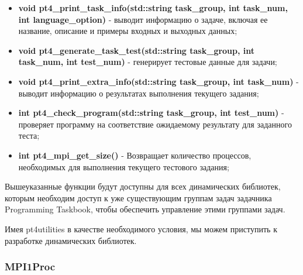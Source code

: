 \begin{itemize}
	\item \textbf{void pt4\_print\_task\_info(std::string task\_group, int task\_num, int language\_option)} - выводит информацию о задаче, включая ее название, описание и примеры входных и выходных данных;
	\item \textbf{void pt4\_generate\_task\_test(std::string task\_group, int task\_num, int test\_num)} - генерирует тестовые данные для задачи;
	\item \textbf{void pt4\_print\_extra\_info(std::string task\_group, int task\_num)} - выводит информацию о результатах выполнения текущего задания;
	\item \textbf{int pt4\_check\_program(std::string task\_group, int test\_num)} - проверяет программу на соответствие ожидаемому результату для заданного теста;
	\item \textbf{int pt4\_mpi\_get\_size()} - Возвращает количество процессов, необходимых для выполнения текущего тестового задания;
\end{itemize}

Вышеуказанные функции будут доступны для всех динамических библиотек, которым необходим 
доступ к уже существующим группам задач задачника Programming Taskbook, чтобы обеспечить 
управление этими группами задач.

Имея pt4utilities в качестве необходимого условия, мы можем приступить к разработке динамических библиотек.

\subsubsection{MPI1Proc}

